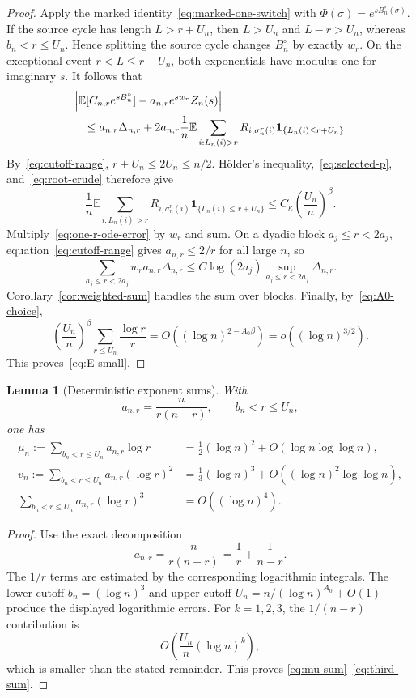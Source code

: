 \documentclass[11pt]{article}
\newtheorem{lemma}[theorem]{Lemma}
\theoremstyle{remark}
\newcommand{\Ee}{\mathbb E}
\newcommand{\one}{\mathbf 1}
\begin{document}
\begin{proof}
Apply the marked identity~\eqref{eq:marked-one-switch} with
$\Phi(\sigma)=e^{sB_n^\circ(\sigma)}$.  If the source cycle has length
$L>r+U_n$, then $L>U_n$ and $L-r>U_n$, whereas
$b_n<r\leq U_n$.  Hence splitting the source cycle changes
$B_n^\circ$ by exactly $w_r$.  On the exceptional event
$r<L\leq r+U_n$, both exponentials have modulus one for imaginary $s$.
It follows that
\begin{align}
 &\left|\Ee[C_{n,r}e^{sB_n^\circ}]
 -a_{n,r}e^{sw_r}Z_n(s)\right|
 \notag\\
 &\quad\leq a_{n,r}\Delta_{n,r}
 +2a_{n,r}\frac1n\Ee\sum_{i:L_n(i)>r}
 R_{i,\sigma_n^r(i)}\one_{\{L_n(i)\leq r+U_n\}}.
 \label{eq:one-r-ode-error}
\end{align}
By~\eqref{eq:cutoff-range}, $r+U_n\leq2U_n\leq n/2$.  H\"older's
inequality,~\eqref{eq:selected-p}, and~\eqref{eq:root-crude} therefore give
\[
 \frac1n\Ee\sum_{i:L_n(i)>r}
 R_{i,\sigma_n^r(i)}\one_{\{L_n(i)\leq r+U_n\}}
 \leq C_\kappa\left(\frac{U_n}{n}\right)^\beta.
\]
Multiply~\eqref{eq:one-r-ode-error} by $w_r$ and sum.  On a dyadic block
$a_j\leq r<2a_j$, equation~\eqref{eq:cutoff-range} gives
$a_{n,r}\leq2/r$ for all large $n$, so
\[
 \sum_{a_j\leq r<2a_j}w_ra_{n,r}\Delta_{n,r}
 \leq C\log(2a_j)\sup_{a_j\leq r<2a_j}\Delta_{n,r}.
\]
Corollary~\ref{cor:weighted-sum} handles the sum over blocks.  Finally,
by~\eqref{eq:A0-choice},
\[
 \left(\frac{U_n}{n}\right)^\beta
 \sum_{r\leq U_n}\frac{\log r}{r}
 =O((\log n)^{2-A_0\beta})
 =o((\log n)^{3/2}).
\]
This proves~\eqref{eq:E-small}.
\end{proof}

\begin{lemma}[Deterministic exponent sums]\label{lem:det-sums}
With
\[
 a_{n,r}=\frac{n}{r(n-r)},\qquad b_n<r\leq U_n,
\]
one has
\begin{align}
 \mu_n:=\sum_{b_n<r\leq U_n}a_{n,r}\log r
 &=\frac12(\log n)^2+O(\log n\log\log n),
 \label{eq:mu-sum}\\
 v_n:=\sum_{b_n<r\leq U_n}a_{n,r}(\log r)^2
 &=\frac13(\log n)^3+O((\log n)^2\log\log n),
 \label{eq:v-sum}\\
 \sum_{b_n<r\leq U_n}a_{n,r}(\log r)^3
 &=O((\log n)^4).
 \label{eq:third-sum}
\end{align}
\end{lemma}

\begin{proof}
Use the exact decomposition
\begin{equation}\label{eq:partial-fraction}
 a_{n,r}=\frac{n}{r(n-r)}=\frac1r+\frac1{n-r}.
\end{equation}
The $1/r$ terms are estimated by the corresponding logarithmic integrals.
The lower cutoff $b_n=(\log n)^3$ and upper cutoff
$U_n=n/(\log n)^{A_0}+O(1)$ produce the displayed logarithmic errors.
For $k=1,2,3$, the $1/(n-r)$ contribution is
\[
 O\left(\frac{U_n}{n}(\log n)^k\right),
\]
which is smaller than the stated remainder.  This proves
\eqref{eq:mu-sum}--\eqref{eq:third-sum}.
\end{proof}
\end{document}
